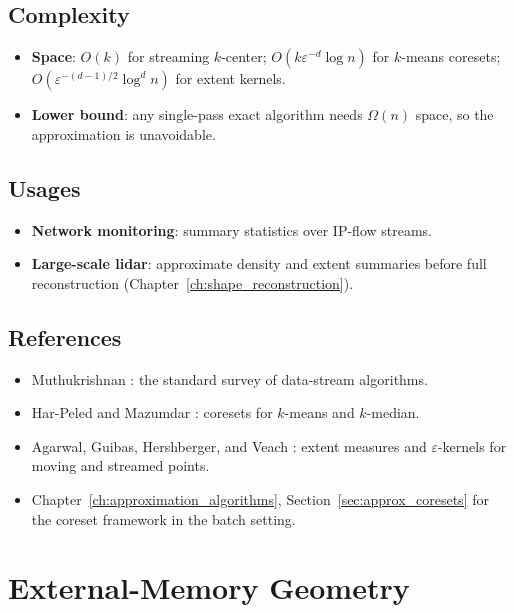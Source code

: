 \subsection{Complexity}

\begin{itemize}
\item \textbf{Space}: $O(k)$ for streaming $k$-center; $O(k \varepsilon^{-d}
  \log n)$ for $k$-means coresets; $O(\varepsilon^{-(d-1)/2} \log^d n)$ for
  extent kernels.
\item \textbf{Lower bound}: any single-pass exact algorithm needs $\Omega(n)$
  space, so the approximation is unavoidable.
\end{itemize}

\subsection{Usages}

\begin{itemize}
\item \textbf{Network monitoring}: summary statistics over IP-flow streams.
\item \textbf{Large-scale lidar}: approximate density and extent summaries
  before full reconstruction (Chapter~\ref{ch:shape_reconstruction}).
\end{itemize}

\subsection{References}

\begin{itemize}
\item Muthukrishnan \cite{muthukrishnan2005}: the standard survey of
  data-stream algorithms.
\item Har-Peled and Mazumdar \cite{harpeled2004}: coresets for $k$-means and
  $k$-median.
\item Agarwal, Guibas, Hershberger, and Veach \cite{agarwal2001extent}:
  extent measures and $\varepsilon$-kernels for moving and streamed points.
\item Chapter~\ref{ch:approximation_algorithms},
  Section~\ref{sec:approx_coresets} for the coreset framework in the batch
  setting.
\end{itemize}

\section{External-Memory Geometry}
\label{sec:frontiers_external_memory}

